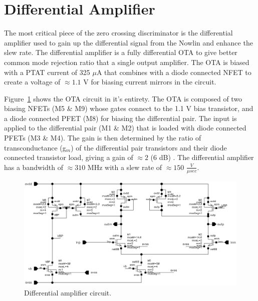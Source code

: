 \documentclass[12pt,oneside,final]{siuethesis}
\theoremstyle{definition}
\begin{document}
\section{Differential Amplifier}
\par The most critical piece of the zero crossing discriminator is the differential amplifier used to gain up the differential signal from the Nowlin and enhance the slew rate. The differential amplifier is a fully differential OTA to give better common mode rejection ratio that a single output amplifier. The OTA is biased with a PTAT current of 325 $\mu$A that combines with a diode connected NFET to create a voltage of $\approx 1.1$ V for biasing current mirrors in the circuit.
\par Figure~\ref{fig:diffamp} shows the OTA circuit in it's entirety. The OTA is composed of two biasing NFETs (M5 \& M9) whose gates connect to the 1.1 V bias transistor, and a diode connected PFET (M8) for biasing the differential pair. The input is applied to the differential pair (M1 \& M2) that is loaded with diode connected PFETs (M3 \& M4). The gain is then determined by the ratio of transconductance (g$_{m}$) of the differential pair transistors and their diode connected transistor load, giving a gain of $\approx 2$ (6 dB) \cite{ALLEN-HOLBERG}. The differential amplifier has a bandwidth of $\approx 310$ MHz with a slew rate of $\approx 150$ $\frac{V}{\mu sec}$. 
\begin{figure}[htbp!]
\centering
\includegraphics[scale=.45,keepaspectratio=true]{images/diffamp.png} 
\caption{Differential amplifier circuit.}
\label{fig:diffamp}
\end{figure}
\end{document}
